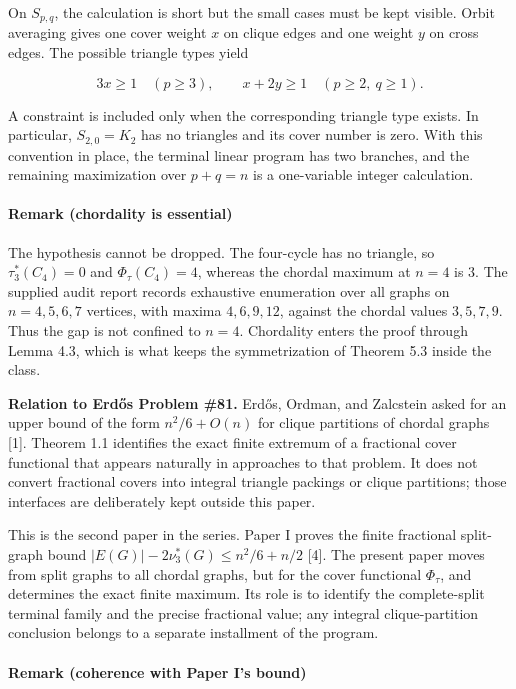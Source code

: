 \documentclass[
  american,
  11pt,
  a4paper,
]{article}
\begin{document}
On \(S_{p,q}\), the calculation is short but the small cases must be kept visible. Orbit averaging gives one cover weight \(x\) on clique edges and one weight \(y\) on cross edges. The possible triangle types yield

\[
3x\ge1
\quad(p\ge3),
\qquad
x+2y\ge1
\quad(p\ge2,\ q\ge1).
\]

A constraint is included only when the corresponding triangle type exists. In particular, \(S_{2,0}=K_2\) has no triangles and its cover number is zero. With this convention in place, the terminal linear program has two branches, and the remaining maximization over \(p+q=n\) is a one-variable integer calculation.

\paragraph{Remark (chordality is essential)}\label{remark-chordality-is-essential}

The hypothesis cannot be dropped. The four-cycle has no triangle, so \(\tau_3^*(C_4)=0\) and \(\Phi_\tau(C_4)=4\), whereas the chordal maximum at \(n=4\) is \(3\). The supplied audit report records exhaustive enumeration over all graphs on \(n=4,5,6,7\) vertices, with maxima \(4,6,9,12\), against the chordal values \(3,5,7,9\). Thus the gap is not confined to \(n=4\). Chordality enters the proof through Lemma 4.3, which is what keeps the symmetrization of Theorem 5.3 inside the class.

\textbf{Relation to Erdős Problem \#81.} Erdős, Ordman, and Zalcstein asked for an upper bound of the form \(n^2/6+O(n)\) for clique partitions of chordal graphs {[}1{]}. Theorem 1.1 identifies the exact finite extremum of a fractional cover functional that appears naturally in approaches to that problem. It does not convert fractional covers into integral triangle packings or clique partitions; those interfaces are deliberately kept outside this paper.

This is the second paper in the series. Paper I proves the finite fractional split-graph bound \(|E(G)|-2\nu_3^*(G)\le n^2/6+n/2\) {[}4{]}. The present paper moves from split graphs to all chordal graphs, but for the cover functional \(\Phi_\tau\), and determines the exact finite maximum. Its role is to identify the complete-split terminal family and the precise fractional value; any integral clique-partition conclusion belongs to a separate installment of the program.

\paragraph{Remark (coherence with Paper I's bound)}\label{remark-coherence-with-paper-is-bound}
\end{document}
